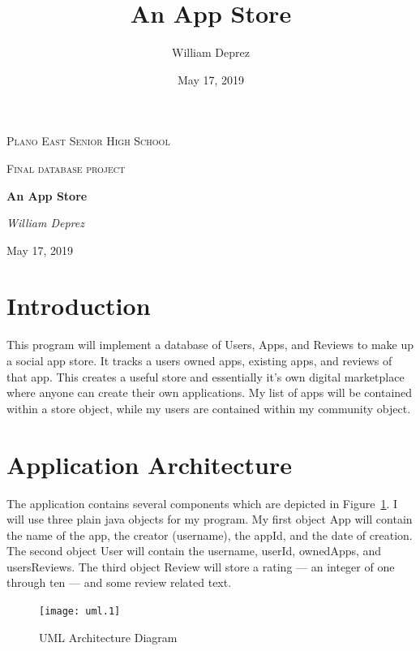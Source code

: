 \documentclass{article}
\title{An App Store}
\author{William Deprez}
\date{May 17, 2019}
\begin{document}
\begin{titlepage}
    \centering
    {\scshape\LARGE Plano East Senior High School \par}
    \vspace{1cm}
    {\scshape\Large Final database project\par}
    \vspace{1.5cm}
    {\huge\bfseries An App Store\par}
    \vspace{2cm}
    \Large\textit{William Deprez}
    \vfill
    {\large May 17, 2019\par}
\end{titlepage}

\section{Introduction}
This program will implement a database of Users, Apps, and Reviews to make up a social app store.
It tracks a user\’s owned apps, existing apps, and reviews of that app.
This creates a useful store and essentially it’s own digital marketplace where anyone can create their own applications.
My list of apps will be contained within a store object, while my users are contained within my community object.

\section{Application Architecture}

The application contains several components which are depicted in Figure~\ref{UML}.
I will use three plain java objects for my program.
My first object App will contain the name of the app, the creator (username), the appId, and the date of creation.
The second object User will contain the username, userId, ownedApps, and usersReviews.
The third object Review will store a rating --- an integer of one through ten --- and some review related text.
\begin{figure}[h]
    \centering
    \texttt{[image: uml.1]}
    \caption{UML Architecture Diagram\label{UML}}
\end{figure}
\end{document}
